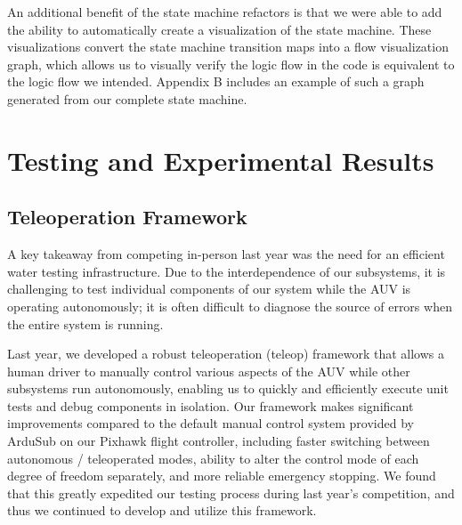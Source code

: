 \documentclass[conference]{IEEEtran}
\begin{document}
An additional benefit of the state machine refactors is that we were able to add the ability to automatically create a visualization of the state machine. These visualizations convert the state machine transition maps into a flow visualization graph, which allows us to visually verify the logic flow in the code is equivalent to the logic flow we intended. Appendix B includes an example of such a graph generated from our complete state machine.




\section{Testing and Experimental Results}
\label{sec:testing}

\subsection{Teleoperation Framework}
\label{ssec:teleop}
A key takeaway from competing in-person last year was the need for an efficient water testing infrastructure. Due to the interdependence of our subsystems, it is challenging to test individual components of our system while the AUV is operating autonomously; it is often difficult to diagnose the source of errors when the entire system is running.

Last year, we developed a robust teleoperation (teleop) framework that allows a human driver to manually control various aspects of the AUV while other subsystems run autonomously, enabling us to quickly and efficiently execute unit tests and debug components in isolation. Our framework makes significant improvements compared to the default manual control system provided by ArduSub on our Pixhawk flight controller, including faster switching between autonomous / teleoperated modes, ability to alter the control mode of each degree of freedom separately, and more reliable emergency stopping. We found that this greatly expedited our testing process during last year’s competition, and thus we continued to develop and utilize this framework.
\end{document}
